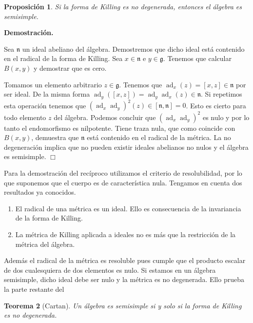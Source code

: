 \documentclass[a4paper,draft,12pt]{article}
\newtheorem{teo}{Teorema}[section]%
\newtheorem{propo}[teo]{Proposición}%
\newcommand{\dem}{\noindent \textbf{Demostración. }\vspace{0.3 cm}}%
\newcommand{\g}{\mathfrak{g}}%
\newcommand{\fin}{ $\Box $ \vspace{0.4 cm}}
\DeclareMathOperator{\ad}{ad}  %
\begin{document}
\begin{propo}

Si la forma de Killing es no degenerada, entonces el álgebra es semisimple.

\end{propo}

\dem

Sea $\mathfrak{n}$ un ideal abeliano del álgebra.  Demostremos que dicho ideal está contenido en el radical de la forma de Killing. Sea $x \in \mathfrak{n}$ e $y\in \g$.  Tenemos que calcular $B(x,y)$ y demostrar que es cero.

Tomamos un elemento arbitrario $z \in \g$.
Tenemos que $\ad_x(z)= [x,z]\in \mathfrak{n}$ por ser ideal.  De la misma forma $\ad_y([x,z]) = \ad_y\ad_x(z) \in \mathfrak{n}$.  Si repetimos esta operación tenemos que $(\ad_x\ad_y)^2(z) \in [\mathfrak{n},\mathfrak{n}]=0$.  Esto es cierto para todo elemento  $z$ del álgebra.  Podemos concluir que $(\ad_x\ad_y)^2$ es nulo y por lo tanto el endomorfismo es nilpotente.  Tiene traza nula, que como coincide con $B(x,y)$, demuestra que $\mathfrak{n}$ está contenido en el radical de la métrica.  La no degeneración implica que no pueden existir ideales abelianos no nulos y el álgebra es semisimple. \fin

Para la demostración del recíproco utilizamos el criterio de resolubilidad, por lo que suponemos que el cuerpo es de característica nula.  Tengamos en cuenta dos resultados ya conocidos.

\begin{enumerate}[\indent 1.- ]

\item El radical de una métrica es un ideal.  Ello es consecuencia de la invariancia de la forma de Killing.

\item La métrica de Killing aplicada a ideales no es más que la restricción de la métrica del álgebra.

\end{enumerate}

  Además el radical de la métrica  es resoluble pues cumple que el producto escalar de dos cualesquiera de dos elementos es nulo.    Si estamos en un álgebra semisimple, dicho ideal debe ser nulo y la métrica es no degenerada.  Ello prueba la parte restante del 

\begin{teo}[Cartan]

Un álgebra es semisimple si y solo si la forma de Killing es no degenerada.

\end{teo}
\end{document}
